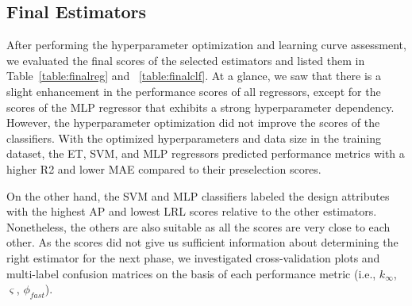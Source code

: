 \subsection{Final Estimators}

    After performing the hyperparameter optimization and learning curve assessment, we evaluated the final scores of the selected estimators and listed them in Table~\ref{table:finalreg} and ~\ref{table:finalclf}. At a glance, we saw that there is a slight enhancement in the performance scores of all regressors, except for the scores of the \gls{MLP} regressor that exhibits a strong hyperparameter dependency. However, the hyperparameter optimization did not improve the scores of the classifiers. With the optimized hyperparameters and data size in the training dataset, the \gls{ET}, \gls{SVM}, and \gls{MLP} regressors predicted performance metrics with a higher \gls{R2} and lower \gls{MAE} compared to their preselection scores.

    On the other hand, the \gls{SVM} and \gls{MLP} classifiers labeled the design attributes with the highest \gls{AP} and lowest \gls{LRL} scores relative to the other estimators. Nonetheless, the others are also suitable as all the scores are very close to each other. As the scores did not give us sufficient information about determining the right estimator for the next phase, we investigated cross-validation plots and multi-label confusion matrices on the basis of each performance metric (i.e., $k_{\infty}$, $\varsigma$, $\phi_{fast}$).

